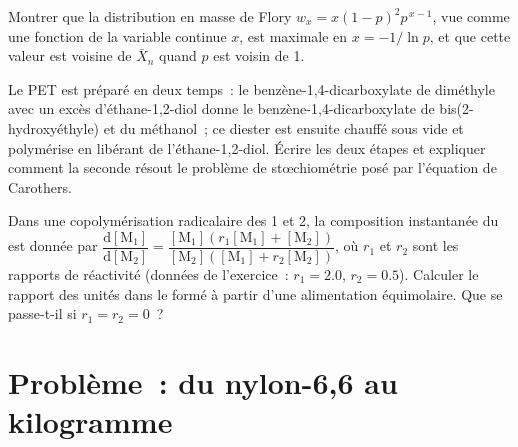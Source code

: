 \begin{exercise}[$\star\star\star$]\label{exo:b2:polymer-synthesis:10}
Montrer que la distribution en masse de Flory $w_x = x(1-p)^2p^{\,x-1}$, vue comme une fonction de la
variable continue $x$, est maximale en $x = -1/\ln p$, et que cette valeur est voisine de $\bar X_n$ quand $p$ est voisin de 1.
\end{exercise}

\begin{exercise}[$\star\star\star$]\label{exo:b2:polymer-synthesis:11}
Le PET est préparé en deux temps~: le benzène-1,4-dicarboxylate de diméthyle avec un excès
d'éthane-1,2-diol donne le benzène-1,4-dicarboxylate de bis(2-hydroxyéthyle) et du méthanol~; ce diester
est ensuite chauffé sous vide et polymérise en libérant de l'éthane-1,2-diol. Écrire les deux étapes et
expliquer comment la seconde résout le problème de stœchiométrie posé par l'équation de Carothers.
\end{exercise}

\begin{exercise}[$\star\star\star$]\label{exo:b2:polymer-synthesis:12}
Dans une copolymérisation radicalaire des  1 et 2, la composition instantanée du  est
donnée par $\dfrac{\mathrm d[\mathrm M_1]}{\mathrm d[\mathrm M_2]} = \dfrac{[\mathrm M_1](r_1[\mathrm M_1]
+ [\mathrm M_2])}{[\mathrm M_2]([\mathrm M_1] + r_2[\mathrm M_2])}$, où $r_1$ et $r_2$ sont les
rapports de réactivité (données de l'exercice~: $r_1 = 2.0$, $r_2 = 0.5$). Calculer le rapport des unités
dans le  formé à partir d'une alimentation équimolaire. Que se passe-t-il si $r_1 = r_2 = 0$~?
\end{exercise}

\section{Problème~: du nylon-6,6 au kilogramme}

